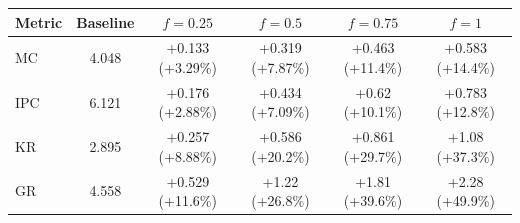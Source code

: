 \begin{tabular}{lccccc}
\toprule
Metric & Baseline & $f=0.25$ & $f=0.5$ & $f=0.75$ & $f=1$ \\
\midrule
MC & 4.048 & +0.133 (+3.29\%) & +0.319 (+7.87\%) & +0.463 (+11.4\%) & +0.583 (+14.4\%) \\
IPC & 6.121 & +0.176 (+2.88\%) & +0.434 (+7.09\%) & +0.62 (+10.1\%) & +0.783 (+12.8\%) \\
KR & 2.895 & +0.257 (+8.88\%) & +0.586 (+20.2\%) & +0.861 (+29.7\%) & +1.08 (+37.3\%) \\
GR & 4.558 & +0.529 (+11.6\%) & +1.22 (+26.8\%) & +1.81 (+39.6\%) & +2.28 (+49.9\%) \\
\bottomrule
\end{tabular}
